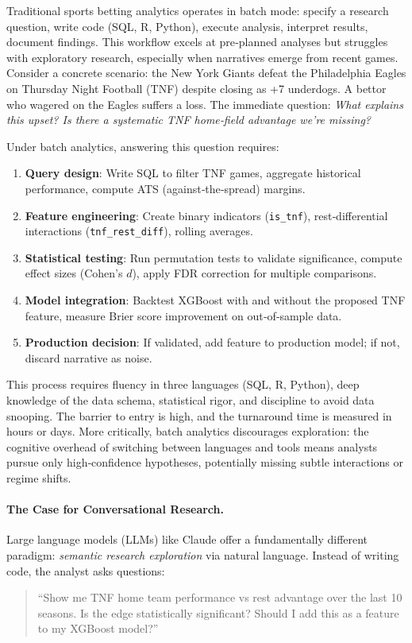 Traditional sports betting analytics operates in batch mode: specify a research question, write code (SQL, R, Python), execute analysis, interpret results, document findings. This workflow excels at pre‑planned analyses but struggles with exploratory research, especially when narratives emerge from recent games. Consider a concrete scenario: the New York Giants defeat the Philadelphia Eagles on Thursday Night Football (TNF) despite closing as +7 underdogs. A bettor who wagered on the Eagles suffers a loss. The immediate question: \textit{What explains this upset? Is there a systematic TNF home‑field advantage we're missing?}

Under batch analytics, answering this question requires:
\begin{enumerate}
\item \textbf{Query design}: Write SQL to filter TNF games, aggregate historical performance, compute ATS (against‑the‑spread) margins.
\item \textbf{Feature engineering}: Create binary indicators (\texttt{is\_tnf}), rest‑differential interactions (\texttt{tnf\_rest\_diff}), rolling averages.
\item \textbf{Statistical testing}: Run permutation tests to validate significance, compute effect sizes (Cohen's $d$), apply FDR correction for multiple comparisons.
\item \textbf{Model integration}: Backtest XGBoost with and without the proposed TNF feature, measure Brier score improvement on out‑of‑sample data.
\item \textbf{Production decision}: If validated, add feature to production model; if not, discard narrative as noise.
\end{enumerate}

This process requires fluency in three languages (SQL, R, Python), deep knowledge of the data schema, statistical rigor, and discipline to avoid data snooping. The barrier to entry is high, and the turnaround time is measured in hours or days. More critically, batch analytics discourages exploration: the cognitive overhead of switching between languages and tools means analysts pursue only high‑confidence hypotheses, potentially missing subtle interactions or regime shifts.

\paragraph{The Case for Conversational Research.}
Large language models (LLMs) like Claude offer a fundamentally different paradigm: \textit{semantic research exploration} via natural language. Instead of writing code, the analyst asks questions:
\begin{quote}
``Show me TNF home team performance vs rest advantage over the last 10 seasons. Is the edge statistically significant? Should I add this as a feature to my XGBoost model?''
\end{quote}

